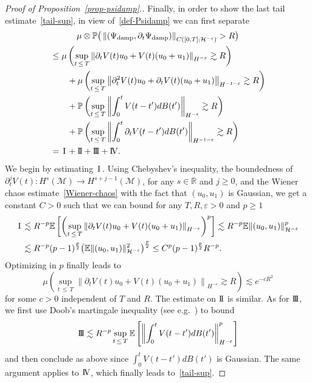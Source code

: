 \documentclass[AHL,Unicode,longabstracts,published]{cedram}
\newcommand{\damp}{\textup{damp}}
\newcommand{\I}{\hspace{0.5mm}\text{I}\hspace{0.5mm}}
\newcommand{\II}{\text{I \hspace{-2.8mm} I} }
\newcommand{\III}{\text{I \hspace{-2.9mm} I \hspace{-2.9mm} I}}
\newcommand{\IV}{\text{I \hspace{-2.9mm} V}}
\newcommand{\R}{\mathbb{R}}
\newcommand{\E}{\mathbb{E}}
\newcommand{\Prob}{\mathbb{P}}
\newcommand{\M}{\mathcal{M}}
\renewcommand{\H}{\mathcal{H}}
\newcommand{\eps}{\varepsilon}
\newcommand{\dt}{\partial_t}
\newcommand{\les}{\lesssim}
\begin{document}
\begin{proof}[Proof of Proposition~\ref{prop-psidamp}.]
Finally, in order to show the last tail estimate~\eqref{tail-sup}, in view of~\eqref{def-Psidamp} we can first separate
\begin{multline*}
\mu\otimes\Prob\big(\left\|\left(\Psi_{\damp},\dt\Psi_\damp\right)\right\|_{C\left([0,T];\H^{-\eps}\right)}>R\big)\\
\begin{aligned}
&\le \mu\left(\sup_{t\,\le\,T}\left\|\dt V(t)u_0 + V(t)(u_0+u_1)\right\|_{H^{-\eps}}\gtrsim R\right)\\
&\qquad+\mu\left(\sup_{t\,\le\,T}\left\|\dt^2 V(t)u_0 + \dt V(t)(u_0+u_1)\right\|_{H^{-1-\eps}}\gtrsim R\right)\\
&\qquad+\Prob\left(\sup_{t\,\le\,T}\left\|\int_0^tV(t-t')dB(t')\right\|_{H^{-\eps}}\gtrsim R\right)\\
&\qquad+\Prob\left(\sup_{t\,\le\,T}\left\|\int_0^t\dt V(t-t')dB(t')\right\|_{H^{-1-\eps}}\gtrsim R\right)\\
&= \I+\II+\III+\IV.
\end{aligned}
\end{multline*}
We begin by estimating $\I$. Using Chebyshev's inequality, the boundedness of $\dt^j V(t): H^s(\M)\to H^{s+j-1}(\M)$, for any $s\in\R$ and $j\ge 0$, and the Wiener chaos estimate~\eqref{Wiener-chaos} with the fact that $(u_0,u_1)$ is Gaussian, we get a constant $C>0$ such that we can bound for any $T,R,\eps>0$ and $p\ge 1$
\begin{align*}
\I & \les R^{-p}\E\left[\left(\sup_{t\,\le\,T}\left\|\dt V(t)u_0 + V(t)(u_0+u_1)\right\|_{H^{-\eps}}\right)^p\right] \les R^{-p} \E\|(u_0,u_1)\|_{\H^{-\eps}}^p \\
&\les R^{-p}(p-1)^{\frac{p}2}\big(\E\|(u_0,u_1)\|_{\H^{-\eps}}^2\big)^{\frac{p}2} \le C^p (p-1)^{\frac{p}2}R^{-p}.
\end{align*}
Optimizing in $p$ finally leads to
\begin{equation*}
\mu\left(\sup_{t\,\le\,T}\left\|\dt V(t)u_0 + V(t)(u_0+u_1)\right\|_{H^{-\eps}}\gtrsim R\right) \les e^{-cR^2}
\end{equation*}
for some $c>0$ independent of $T$ and $R$. The estimate on $\II$ is similar. As for $\III$, we first use Doob's martingale inequality (see e.g.~\cite[Theorem~3.9]{DPZ}) to bound
\begin{equation*}
\III \les R^{-p}\sup_{t\,\le\,T}\E\left[\left\|\int_0^tV(t-t')dB(t')\right\|_{H^{-\eps}}^p\right]
\end{equation*}
and then conclude as above since $\int_0^tV(t-t')dB(t')$ is Gaussian. The same argument applies to $\IV$, which finally leads to~\eqref{tail-sup}.
\end{proof}
\end{document}
